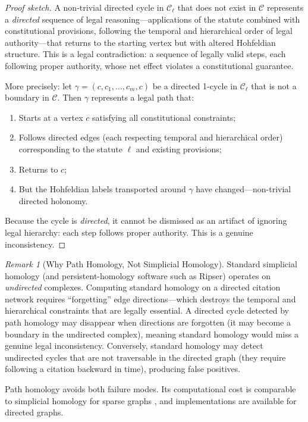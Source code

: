 \documentclass[12pt]{article}
\theoremstyle{definition}
\theoremstyle{remark}
\newtheorem{remark}[theorem]{Remark}
\newcommand{\C}{\mathcal{C}}               %
\begin{document}
\begin{proof}[Proof sketch]
A non-trivial directed cycle in $\C_\ell$ that does not exist in $\C$ represents a \emph{directed} sequence of legal reasoning---applications of the statute combined with constitutional provisions, following the temporal and hierarchical order of legal authority---that returns to the starting vertex but with altered Hohfeldian structure.  This is a legal contradiction: a sequence of legally valid steps, each following proper authority, whose net effect violates a constitutional guarantee.

More precisely: let $\gamma = (c, c_1, \ldots, c_m, c)$ be a directed 1-cycle in $\C_\ell$ that is not a boundary in $\C$.  Then $\gamma$ represents a legal path that:
\begin{enumerate}
    \item Starts at a vertex $c$ satisfying all constitutional constraints;
    \item Follows directed edges (each respecting temporal and hierarchical order) corresponding to the statute $\ell$ and existing provisions;
    \item Returns to $c$;
    \item But the Hohfeldian labels transported around $\gamma$ have changed---non-trivial directed holonomy.
\end{enumerate}
Because the cycle is \emph{directed}, it cannot be dismissed as an artifact of ignoring legal hierarchy: each step follows proper authority.  This is a genuine inconsistency.
\end{proof}

\begin{remark}[Why Path Homology, Not Simplicial Homology]
\label{rem:path_homology}
Standard simplicial homology (and persistent-homology software such as Ripser) operates on \emph{undirected} complexes.  Computing standard homology on a directed citation network requires ``forgetting'' edge directions---which destroys the temporal and hierarchical constraints that are legally essential.  A directed cycle detected by path homology may disappear when directions are forgotten (it may become a boundary in the undirected complex), meaning standard homology would miss a genuine legal inconsistency.  Conversely, standard homology may detect undirected cycles that are not traversable in the directed graph (they require following a citation backward in time), producing false positives.

Path homology avoids both failure modes.  Its computational cost is comparable to simplicial homology for sparse graphs \cite{grigoryan2014}, and implementations are available for directed graphs.
\end{remark}
\end{document}
